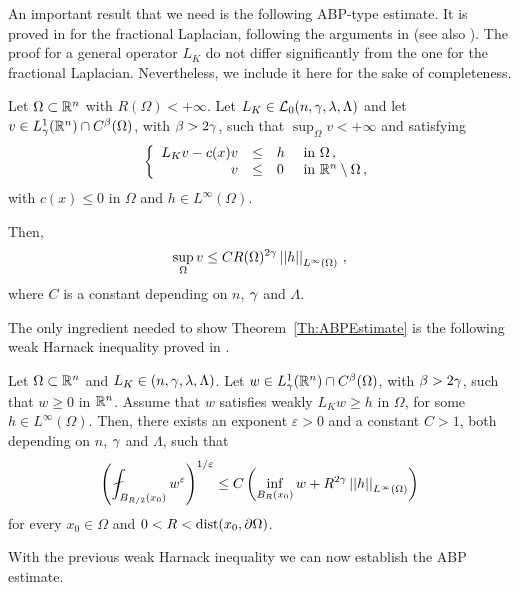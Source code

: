 An important result that we need is the following ABP-type estimate. It is proved in \cite{QuaasXia} for the fractional Laplacian, following the arguments in \cite{Cabre-ABP} (see also \cite{Cabre-Topics}). The proof for a general operator $L_K$ do not differ significantly from the one for the fractional Laplacian. Nevertheless, we include it here for the sake of completeness.

\begin{theorem}
	\label{Th:ABPEstimate}
	Let $\Omega \subset \mathbb{R}^n$ with $R(\Omega) < +\infty$. Let $L_K \in \mathcal{L}_0(n,\gamma,\lambda, \Lambda)$ and let $v\in L^1_\gamma(\mathbb{R}^n)\cap C^{\beta}(\Omega)$, with $\beta > 2\gamma$, such that $\sup_{\Omega} v < +\infty$ and satisfying
	$$
	\left\{\begin{array}{rcll}
	L_K v - c(x)v &\leq & h & \text{ in } \Omega\,, \\
	v & \leq & 0 & \text{ in } \mathbb{R}^n\setminus \Omega\,,
	\end{array} \right.
	$$
	with $c(x)\leq 0$ in $\Omega$ and $h\in L^\infty(\Omega)$.
	
	Then,
	$$
	\sup_\Omega v \leq C R(\Omega)^{2\gamma} \left | \left |{h} \right | \right |_{L^{\infty}(\Omega)}\,,
	$$
	where $C$ is a constant depending on $n$, $\gamma$ and $\Lambda$.
\end{theorem}


The only ingredient needed to show Theorem~\ref{Th:ABPEstimate} is the following weak Harnack inequality proved in  \cite{Cozzi-DeGiorgiClassesShort}.

\begin{proposition}
	
	\label{Prop:WeakHarnack}
		
	Let $\Omega \subset \mathbb{R}^n$ and $L_K\in (n,\gamma,\lambda, \Lambda)$. Let $w \in L^1_\gamma(\mathbb{R}^n)\cap C^{\beta}(\Omega)$, with $\beta > 2\gamma$, such that $w\geq 0$ in $\mathbb{R}^n$. Assume that $w$ satisfies weakly $L_K w \geq h$ in $\Omega$, for some $h\in L^\infty (\Omega)$. Then, there exists an exponent $\varepsilon > 0 $  and a constant $C > 1$, both depending on $n$, $\gamma$ and $\Lambda$, such that
	$$
	 \bpar{ \fint_{B_{R/2}(x_0)} w^\varepsilon}^{1/\varepsilon} \leq C \bpar{\inf_{B_{R}(x_0)} w + R^{2\s} \norm{h}_{L^{\infty}(\Omega)} }
	$$
	for every $x_0\in \Omega$ and $0<R<\operatorname{dist}(x_0, \partial \Omega)$.
\end{proposition}

With the previous weak Harnack inequality we can now establish the ABP estimate.

